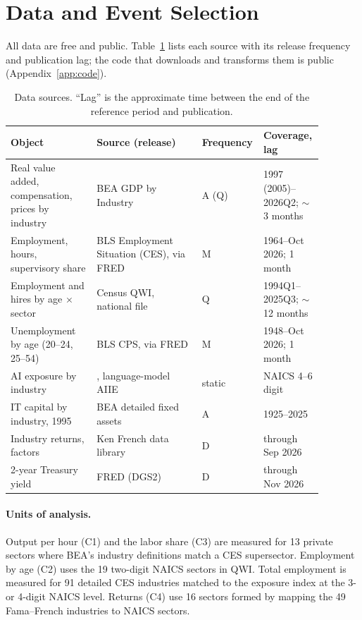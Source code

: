 \section{Data and Event Selection}
\label{sec:data}

All data are free and public. Table~\ref{tab:data} lists each source with its release frequency and publication lag; the code that downloads and transforms them is public (Appendix~\ref{app:code}).

\begin{table}[t]
\caption{Data sources. ``Lag'' is the approximate time between the end of the reference period and publication.}
\label{tab:data}
\begin{singlespace}\small\centering
\begin{tabular}{p{0.27\linewidth}p{0.33\linewidth}p{0.13\linewidth}p{0.15\linewidth}}
\toprule
Object & Source (release) & Frequency & Coverage, lag \\
\midrule
Real value added, compensation, prices by industry & BEA GDP by Industry & A (Q) & 1997 (2005)--2026Q2; $\sim$3 months \\
Employment, hours, supervisory share & BLS Employment Situation (CES), via FRED & M & 1964--Oct 2026; 1 month \\
Employment and hires by age $\times$ sector & Census QWI, national file & Q & 1994Q1--2025Q3; $\sim$12 months \\
Unemployment by age (20--24, 25--54) & BLS CPS, via FRED & M & 1948--Oct 2026; 1 month \\
AI exposure by industry & \citet{felten2023language}, language-model AIIE & static & NAICS 4--6 digit \\
IT capital by industry, 1995 & BEA detailed fixed assets & A & 1925--2025 \\
Industry returns, factors & Ken French data library & D & through Sep 2026 \\
2-year Treasury yield & FRED (DGS2) & D & through Nov 2026 \\
\bottomrule
\end{tabular}
\end{singlespace}
\end{table}

\paragraph{Units of analysis.} Output per hour (C1) and the labor share (C3) are measured for 13 private sectors where BEA's industry definitions match a CES supersector. Employment by age (C2) uses the 19 two-digit NAICS sectors in QWI. Total employment is measured for 91 detailed CES industries matched to the exposure index at the 3- or 4-digit NAICS level. Returns (C4) use 16 sectors formed by mapping the 49 Fama--French industries to NAICS sectors.

